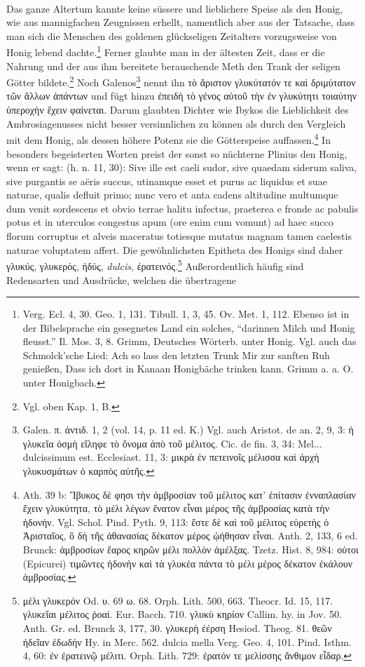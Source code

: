 \documentclass[a4paper, 11pt, oneside]{article}
\begin{document}
\paragraph{}
Das ganze Altertum kannte keine süssere und lieblichere Speise als den Honig, wie aus mannigfachen Zeugnissen erhellt, namentlich aber aus der Tatsache, dass man sich die Menschen des goldenen glückseligen Zeitalters vorzugsweise von Honig lebend dachte.\footnote{Verg. Ecl. 4, 30. Geo. 1, 131. Tibull. 1, 3, 45. Ov. Met. 1, 112. Ebenso ist in der Bibelsprache ein gesegnetes Land ein solches, "`darinnen Milch und Honig fleusst."' Il. Mos. 3, 8. Grimm, Deutsches Wörterb. unter Honig. Vgl. auch das Schmolck'sche Lied: Ach so lass den letzten Trunk Mir zur sanften Ruh genießen, Dass ich dort in Kanaan Honigbäche trinken kann. Grimm a. a. O. unter Honigbach.} Ferner glaubte man in der ältesten Zeit, dass er die Nahrung und der aus ihm bereitete berauschende Meth den Trank der seligen Götter bildete.\footnote{Vgl. oben Kap. 1, B.} Noch Galenos\footnote{Galen. π. ἀντιδ. 1, 2 (vol. 14, p. 11 ed. K.) Vgl. auch Aristot. de an. 2, 9, 3: ἡ γλυκεῖα ὀσμὴ εἴληφε τὸ ὄνομα ἀπὸ τοῦ μέλιτος. Cic. de fin. 3, 34: Mel... dulcissimum est. Ecclesiast. 11, 3: μικρὰ ἐν πετεινοῖς μέλισσα καὶ ἀρχὴ γλυκυσμάτων ὁ καρπὸς αὐτῆς.} nennt ihn τὸ ἄριστον γλυκύτατόν τε καὶ δριμύτατον τῶν ἄλλων ἁπάντων und fügt hinzu ἐπειδὴ τὸ γένος αὐτοῦ τὴν ἐν γλυκύτητι τοιαύτην ὑπεροχὴν ἔχειν φαίνεται. Darum glaubten Dichter wie Ibykos die Lieblichkeit des Ambrosiagenusses nicht besser versinnlichen zu können als durch den Vergleich mit dem Honig, als dessen höhere Potenz sie die Götterspeise auffassen.\footnote{Ath. 39 b: Ἴβυκος δὲ φησι τὴν ἀμβροσίαν τοῦ μέλιτος κατ' ἐπίτασιν ἐνναπλασίαν ἔχειν γλυκύτητα, τὸ μέλι λέγων ἔνατον εἶναι μέρος τῆς ἀμβροσίας κατὰ τὴν ἡδονήν. Vgl. Schol. Pind. Pyth. 9, 113: ἔστε δὲ καὶ τοῦ μέλιτος εὑρετὴς ὁ Ἀρισταῖος, ὃ δὴ τῆς ἀθανασίας δέκατον μέρος ᾠήθησαν εἶναι. Anth. 2, 133, 6 ed. Brunck: ἀμβροσίων ἔαρος κηρῶν μέλι πολλὸν ἀμέλξας. Tzetz. Hist. 8, 984: οὑτοι (Epicurei) τιμῶντες ἡδονὴν καὶ τὰ γλυκέα πάντα τὸ μέλι μέρος δέκατον ἐκάλουν ἀμβροσίας.} In besonders begeisterten Worten preist der sonst so nüchterne Plinius den Honig, wenn er sagt: (h. n. 11, 30): Sive ille est caeli sudor, sive quaedam siderum saliva, sive purgantis se aëris succus, utinamque esset et purus ac liquidus et suae naturae, qualis defluit primo; nunc vero et anta cadens altitudine multumque dum venit sordescens et obvio terrae halitu infectus, praeterea e fronde ac pabulis potus et in uterculos congestus apum (ore enim cum vomunt) ad haec succo florum corruptus et alveis maceratus totiesque mutatus magnam tamen caelestis naturae voluptatem affert. Die gewöhnlichsten Epitheta des Honigs sind daher γλυκύς, γλυκερός, ἡδύς, \emph{dulcis}, ἐρατεινός.\footnote{μέλι γλυκερόν Od. υ. 69 ω. 68. Orph. Lith. 500, 663. Theocr. Id. 15, 117. γλυκεῖαι μέλιτος ῥοαί. Eur. Bacch. 710. γλυκὺ κηρίον Callim. hy. in Jov. 50. Anth. Gr. ed. Brunck 3, 177, 30. γλυκερὴ ἐέρση Hesiod. Theog. 81. θεῶν ἡδεῖαν ἐδωδήν Hy. in Merc. 562. dulcia mella Verg. Geo. 4, 101. Pind. Isthm. 4, 60: ἐν ἐρατεινῷ μέλιτι. Orph. Lith. 729: ἐρατόν τε μελίσσης ἄνθιμον εἶδαρ.} Außerordentlich häufig sind Redensarten und Ausdrücke, welchen die übertragene 
\end{document}
